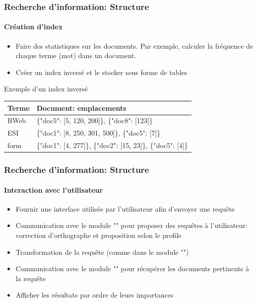 \documentclass[xcolor=table]{beamer}
\begin{document}
\begin{frame}
\frametitle{Recherche d'information: Structure}
\framesubtitle{Création d'index}

\begin{itemize}
	\item Faire des statistiques sur les documents. 
	Par exemple, calculer la fréquence de chaque terme (mot) dans un document. 
	\item Créer un index inversé et le stocker sous forme de tables
\end{itemize}

\begin{exampleblock}{Exemple d'un index inversé}
	\begin{tabular}{|l|l|}
		\hline
		\textbf{Terme} & \textbf{Document: emplacements} \\
		\hline
		BWeb & \{"doc5": [5, 120, 200]\}, \{"doc8": [123]\} \\\hline
		ESI & \{"doc1": [8, 250, 301, 500]\}, \{"doc5": [7]\}\\\hline
		form & \{"doc1": [4, 277]\}, \{"doc2": [15, 23]\}, \{"doc5": [4]\}\\
		\hline
	\end{tabular}
\end{exampleblock}

\end{frame}

\begin{frame}
\frametitle{Recherche d'information: Structure}
\framesubtitle{Interaction avec l'utilisateur}

\begin{itemize}
	\item Fournir une interface utilisée par l'utilisateur afin d'envoyer une requête
	\item Communication avec le module "" pour proposer des requêtes à l'utilisateur: correction d'orthographe et proposition selon le profile 
	\item Transformation de la requête (comme dans le module "")
	\item Communication avec le module "" pour récupérer les documents pertinents à la requête
	\item Afficher les résultats par ordre de leurs importances
\end{itemize}

\end{frame}
\end{document}
